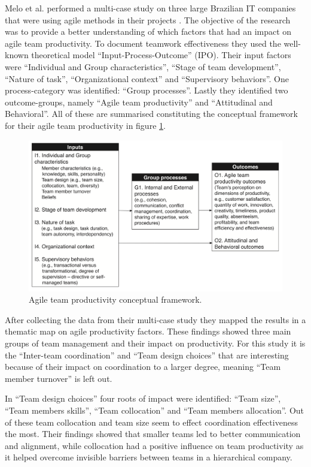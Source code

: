 Melo et al. performed a multi-case study on three large Brazilian IT companies that were using agile methods in their projects \cite{Melo2013}. The objective of the research was to provide a better understanding of which factors that had an impact on agile team productivity. To document teamwork effectiveness they used the well-known theoretical model ``Input-Process-Outcome'' (IPO). Their input factors were ``Individual and Group characteristics'', ``Stage of team development'', ``Nature of task'', ``Organizational context'' and ``Supervisory behaviors''. One process-category was identified: ``Group processes''. Lastly they identified two outcome-groups, namely ``Agile team productivity'' and ``Attitudinal and Behavioral''. All of these are summarised constituting the conceptual framework for their agile team productivity in figure \ref{atpcf}.

\begin{figure}
\centering
\includegraphics[width=\textwidth]{images/IPO.png}
\caption{Agile team productivity conceptual framework.}
\label{atpcf}
\end{figure}

After collecting the data from their multi-case study they mapped the results in a thematic map on agile productivity factors. These findings showed three main groups of team management and their impact on productivity. For this study it is the ``Inter-team coordination'' and ``Team design choices'' that are interesting because of their impact on coordination to a larger degree, meaning ``Team member turnover'' is left out. 

In ``Team design choices'' four roots of impact were identified: ``Team size'', ``Team members skills'', ``Team collocation'' and ``Team members allocation''. Out of these team collocation and team size seem to effect coordination effectiveness the most. Their findings showed that smaller teams led to better communication and alignment, while collocation had a positive influence on team productivity as it helped overcome invisible barriers between teams in a hierarchical company.


